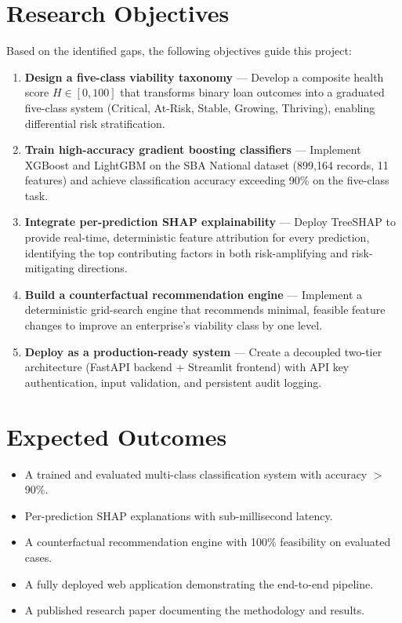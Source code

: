 \documentclass[12pt,a4paper]{report}
\begin{document}
\section{Research Objectives}

Based on the identified gaps, the following objectives guide this project:

\begin{enumerate}
    \item \textbf{Design a five-class viability taxonomy} --- Develop a composite health score $H \in [0, 100]$ that transforms binary loan outcomes into a graduated five-class system (Critical, At-Risk, Stable, Growing, Thriving), enabling differential risk stratification.

    \item \textbf{Train high-accuracy gradient boosting classifiers} --- Implement XGBoost and LightGBM on the SBA National dataset (899,164 records, 11 features) and achieve classification accuracy exceeding 90\% on the five-class task.

    \item \textbf{Integrate per-prediction SHAP explainability} --- Deploy TreeSHAP to provide real-time, deterministic feature attribution for every prediction, identifying the top contributing factors in both risk-amplifying and risk-mitigating directions.

    \item \textbf{Build a counterfactual recommendation engine} --- Implement a deterministic grid-search engine that recommends minimal, feasible feature changes to improve an enterprise's viability class by one level.

    \item \textbf{Deploy as a production-ready system} --- Create a decoupled two-tier architecture (FastAPI backend + Streamlit frontend) with API key authentication, input validation, and persistent audit logging.
\end{enumerate}

\section{Expected Outcomes}

\begin{itemize}
    \item A trained and evaluated multi-class classification system with accuracy $>$ 90\%.
    \item Per-prediction SHAP explanations with sub-millisecond latency.
    \item A counterfactual recommendation engine with 100\% feasibility on evaluated cases.
    \item A fully deployed web application demonstrating the end-to-end pipeline.
    \item A published research paper documenting the methodology and results.
\end{itemize}
\end{document}
